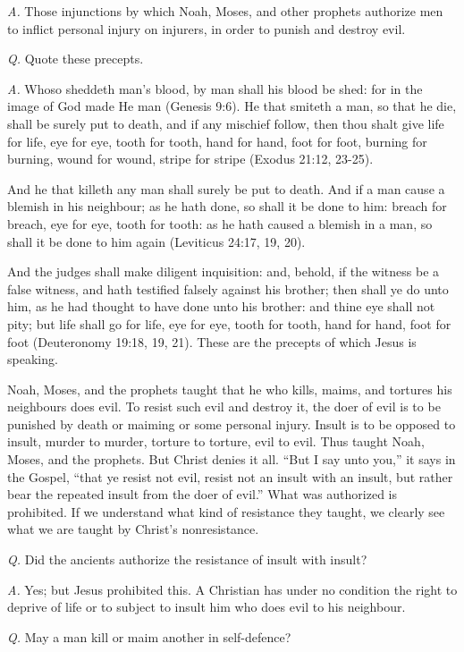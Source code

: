\documentclass{book}
\begin{document}
\emph{A.} Those injunctions by which Noah, Moses, and other prophets authorize men to inflict personal injury on injurers, in order to punish and destroy evil.

\emph{Q.} Quote these precepts.

\emph{A.} Whoso sheddeth man’s blood, by man shall his blood be shed: for in the image of God made He man (Genesis 9:6). He that smiteth a man, so that he die, shall be surely put to death, and if any mischief follow, then thou shalt give life for life, eye for eye, tooth for tooth, hand for hand, foot for foot, burning for burning, wound for wound, stripe for stripe (Exodus 21:12, 23-25).

And he that killeth any man shall surely be put to death. And if a man cause a blemish in his neighbour; as he hath done, so shall it be done to him: breach for breach, eye for eye, tooth for tooth: as he hath caused a blemish in a man, so shall it be done to him again (Leviticus 24:17, 19, 20).

And the judges shall make diligent inquisition: and, behold, if the witness be a false witness, and hath testified falsely against his brother; then shall ye do unto him, as he had thought to have done unto his brother: and thine eye shall not pity; but life shall go for life, eye for eye, tooth for tooth, hand for hand, foot for foot (Deuteronomy 19:18, 19, 21). These are the precepts of which Jesus is speaking.

Noah, Moses, and the prophets taught that he who kills, maims, and tortures his neighbours does evil. To resist such evil and destroy it, the doer of evil is to be punished by death or maiming or some personal injury. Insult is to be opposed to insult, murder to murder, torture to torture, evil to evil. Thus taught Noah, Moses, and the prophets. But Christ denies it all. “But I say unto you,” it says in the Gospel, “that ye resist not evil, resist not an insult with an insult, but rather bear the repeated insult from the doer of evil.” What was authorized is prohibited. If we understand what kind of resistance they taught, we clearly see what we are taught by Christ’s nonresistance.

\emph{Q.} Did the ancients authorize the resistance of insult with insult?

\emph{A.} Yes; but Jesus prohibited this. A Christian has under no condition the right to deprive of life or to subject to insult him who does evil to his neighbour.

\emph{Q.} May a man kill or maim another in self-defence?
\end{document}
